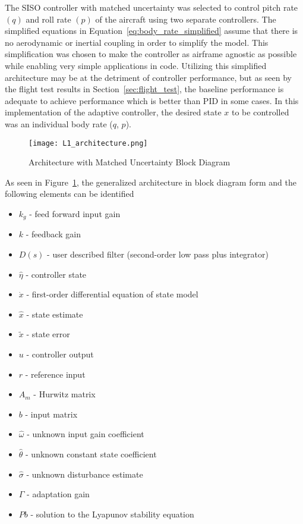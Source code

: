 The \ac{SISO} controller with matched uncertainty was selected to control pitch rate $(q)$ and roll rate $(p)$ of the aircraft using two separate controllers.  The simplified equations in Equation~\ref{eq:body_rate_simplified} assume that there is no aerodynamic or inertial coupling in order to simplify the model.  This simplification was chosen to make the controller as airframe agnostic as possible while enabling very simple applications in code.  Utilizing this simplified architecture may be at the detriment of controller performance, but as seen by the flight test results in Section~\ref{sec:flight_test}, the baseline performance is adequate to achieve performance which is better than \ac{PID} in some cases.  In this implementation of the \Lone adaptive controller, the desired state $x$ to be controlled was an individual body rate (\eg $q$, $p$). 

\begin{figure}[h!]
 \centering
  \texttt{[image: L1\_architecture.png]}
  \caption{\Lone Architecture with Matched Uncertainty Block Diagram \cite{hovakimyan2010l1} }
  \label{fig:l1_architecture}
\end{figure}

As seen in Figure~\ref{fig:l1_architecture}, the generalized \Lone architecture in block diagram form and the following elements can be identified
\begin{itemize}
 \item[] $k_g$ - feed forward input gain
 \item[] $k$ - feedback gain
 \item[] $D(s)$ - user described filter (second-order low pass plus integrator)
 \item[] $\hat{\eta}$ - \Lone controller state
 \item[] $\dot{x}$ - first-order differential equation of state model
 \item[] $\hat{x}$ - state estimate
 \item[] $\tilde{x}$ - state error
 \item[] $u$ - controller output
 \item[] $r$ - reference input
 \item[] $A_m$ - Hurwitz matrix
 \item[] $b$ - input matrix
 \item[] $\hat{\omega}$ - unknown input gain coefficient
 \item[] $\hat{\theta}$ - unknown constant state coefficient
 \item[] $\hat{\sigma}$ - unknown disturbance estimate
 \item[] $\Gamma$ - adaptation gain
 \item[] $Pb$ - solution to the Lyapunov stability equation 
\end{itemize}

